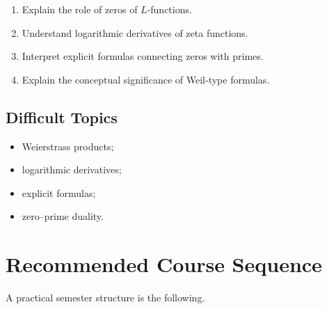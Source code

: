 \documentclass[11pt,a4paper]{article}
\begin{document}
\begin{enumerate}
    \item Explain the role of zeros of \(L\)-functions.
    \item Understand logarithmic derivatives of zeta functions.
    \item Interpret explicit formulas connecting zeros with primes.
    \item Explain the conceptual significance of Weil-type formulas.
\end{enumerate}

\subsection{Difficult Topics}

\begin{itemize}
    \item Weierstrass products;
    \item logarithmic derivatives;
    \item explicit formulas;
    \item zero--prime duality.
\end{itemize}

\section{Recommended Course Sequence}

A practical semester structure is the following.
\end{document}
